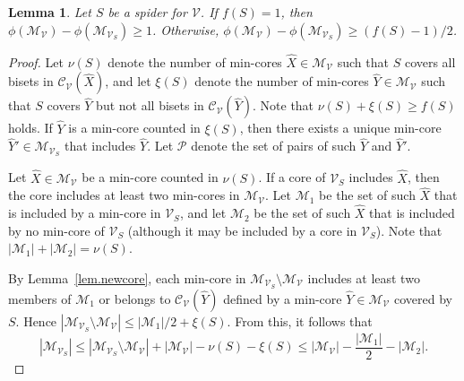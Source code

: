 \documentclass[11pt]{article}
\newtheorem{lemma}{Lemma}
\newcommand{\Mfam}{\mathcal{M}}
\newcommand{\Cfam}{\mathcal{C}}
\newcommand{\Vfam}{\mathcal{V}}
\newcommand{\Pfam}{\mathcal{P}}
\begin{document}
\begin{lemma}\label{lem.potentialdecrease}
 Let $S$ be a spider for $\Vfam$. If $f(S)=1$, then 
 $\phi(\Mfam_{\Vfam}) - \phi(\Mfam_{\Vfam_S}) \geq 1$.
 Otherwise, $\phi(\Mfam_{\Vfam}) - \phi(\Mfam_{\Vfam_S}) \geq (f(S)-1)/2$.
\end{lemma}
\begin{proof}
 Let $\nu(S)$ denote the number of min-cores
 $\hat{X} \in \Mfam_{\Vfam}$
 such that $S$ covers all bisets in $\Cfam_{\Vfam}(\hat{X})$, and let $\xi(S)$ denote the
 number of min-cores $\hat{Y} \in \Mfam_{\Vfam}$ 
 such that $S$ covers $\hat{Y}$ but not all bisets in $\Cfam_{\Vfam}(\hat{Y})$.
 Note that $\nu(S)+\xi(S)\geq f(S)$ holds.
 If $\hat{Y}$ is a min-core counted in $\xi(S)$,
 then there exists a unique min-core $\hat{Y}' \in \Mfam_{\Vfam_S}$ that
 includes $\hat{Y}$. Let $\Pfam$ denote the set of pairs of such $\hat{Y}$ and $\hat{Y}'$.

 Let $\hat{X} \in \Mfam_{\Vfam}$ be a min-core counted in $\nu(S)$.
 If a core of $\Vfam_S$ includes $\hat{X}$, then
 the core includes at least two min-cores in $\Mfam_{\Vfam}$.
 Let $\Mfam_1$ be the set of such $\hat{X}$ that
 is included by a min-core in $\Vfam_S$, 
 and let $\Mfam_2$ be the set of such $\hat{X}$
 that 
 is included by no min-core of $\Vfam_S$ (although it may be included by a core in $\Vfam_S$).
 Note that $|\Mfam_1|+|\Mfam_2|= \nu(S)$.

 By Lemma~\ref{lem.newcore},
 each min-core in $\Mfam_{\Vfam_S} \setminus \Mfam_{\Vfam}$  
 includes at least two members of $\Mfam_1$ 
 or belongs to $\Cfam_{\Vfam}(\hat{Y})$ defined by a min-core 
 $\hat{Y}\in \Mfam_{\Vfam}$ covered by $S$.
 Hence
 $|\Mfam_{\Vfam_S} \setminus \Mfam_{\Vfam}| \leq |\Mfam_1| /2 +  \xi(S)$.
 From this, it follows that 
 \[
  |\Mfam_{\Vfam_S}| \leq |\Mfam_{\Vfam_S} \setminus \Mfam_{\Vfam}| + |\Mfam_{\Vfam}| -\nu(S) - \xi(S)
 \leq |\Mfam_{\Vfam}| - \frac{|\Mfam_1|}{2} - |\Mfam_2|.
\]
 

\end{proof}
\end{document}

